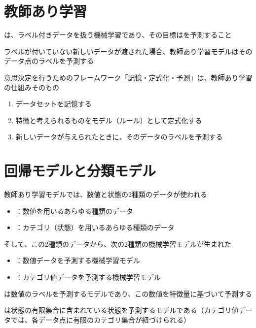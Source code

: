 \documentclass[../../../topic_machine-learning]{subfiles}
\begin{document}
\sectionline
\section{教師あり学習}

は、ラベル付きデータを扱う機械学習であり、その目標はを予測すること

ラベルが付いていない新しいデータが渡された場合、教師あり学習モデルはそのデータ点のラベルを予測する

\br

意思決定を行うためのフレームワーク「記憶・定式化・予測」は、教師あり学習の仕組みそのもの

\begin{enumerate}
  \item データセットを記憶する
  \item 特徴と考えられるものをモデル（ルール）として定式化する
  \item 新しいデータが与えられたときに、そのデータのラベルを予測する
\end{enumerate}

\sectionline
\section{回帰モデルと分類モデル}

教師あり学習モデルでは、数値と状態の2種類のデータが使われる

\begin{itemize}
  \item {}：数値を用いるあらゆる種類のデータ
  \item {}：カテゴリ（状態）を用いるあらゆる種類のデータ
\end{itemize}

\br

そして、この2種類のデータから、次の2種類の機械学習モデルが生まれた

\begin{itemize}
  \item {}：数値データを予測する機械学習モデル
  \item {}：カテゴリ値データを予測する機械学習モデル
\end{itemize}

\br

は数値のラベルを予測するモデルであり、この数値を特徴量に基づいて予測する

\br

は状態の有限集合に含まれている状態を予測するモデルである（カテゴリ値データでは、各データ点に有限のカテゴリ集合が紐づけられる）
\end{document}
